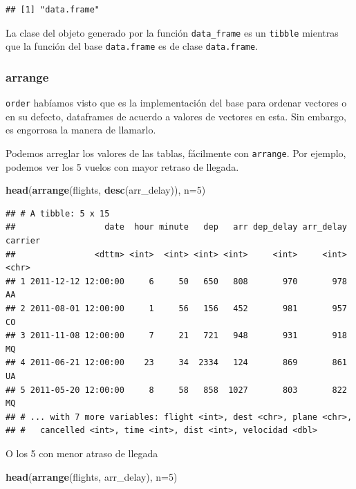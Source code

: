 \documentclass[]{article}
\newenvironment{Shaded}{\begin{snugshade}}{\end{snugshade}}
\newcommand{\KeywordTok}[1]{\textcolor[rgb]{0.13,0.29,0.53}{\textbf{#1}}}
\newcommand{\DataTypeTok}[1]{\textcolor[rgb]{0.13,0.29,0.53}{#1}}
\newcommand{\DecValTok}[1]{\textcolor[rgb]{0.00,0.00,0.81}{#1}}
\newcommand{\NormalTok}[1]{#1}
\begin{document}
\begin{verbatim}
## [1] "data.frame"
\end{verbatim}

La clase del objeto generado por la función \texttt{data\_frame} es un
\texttt{tibble} mientras que la función del base \texttt{data.frame} es
de clase \texttt{data.frame}.

\subsubsection{arrange}\label{arrange}

\texttt{order} habíamos visto que es la implementación del base para
ordenar vectores o en su defecto, dataframes de acuerdo a valores de
vectores en esta. Sin embargo, es engorrosa la manera de llamarlo.

Podemos arreglar los valores de las tablas, fácilmente con
\texttt{arrange}. Por ejemplo, podemos ver los 5 vuelos con mayor
retraso de llegada.

\begin{Shaded}
\begin{Highlighting}[]
\KeywordTok{head}\NormalTok{(}\KeywordTok{arrange}\NormalTok{(flights, }\KeywordTok{desc}\NormalTok{(arr_delay)), }\DataTypeTok{n=}\DecValTok{5}\NormalTok{)}
\end{Highlighting}
\end{Shaded}

\begin{verbatim}
## # A tibble: 5 x 15
##                  date  hour minute   dep   arr dep_delay arr_delay carrier
##                <dttm> <int>  <int> <int> <int>     <int>     <int>   <chr>
## 1 2011-12-12 12:00:00     6     50   650   808       970       978      AA
## 2 2011-08-01 12:00:00     1     56   156   452       981       957      CO
## 3 2011-11-08 12:00:00     7     21   721   948       931       918      MQ
## 4 2011-06-21 12:00:00    23     34  2334   124       869       861      UA
## 5 2011-05-20 12:00:00     8     58   858  1027       803       822      MQ
## # ... with 7 more variables: flight <int>, dest <chr>, plane <chr>,
## #   cancelled <int>, time <int>, dist <int>, velocidad <dbl>
\end{verbatim}

O los 5 con menor atraso de llegada

\begin{Shaded}
\begin{Highlighting}[]
\KeywordTok{head}\NormalTok{(}\KeywordTok{arrange}\NormalTok{(flights, arr_delay), }\DataTypeTok{n=}\DecValTok{5}\NormalTok{)}
\end{Highlighting}
\end{Shaded}
\end{document}
